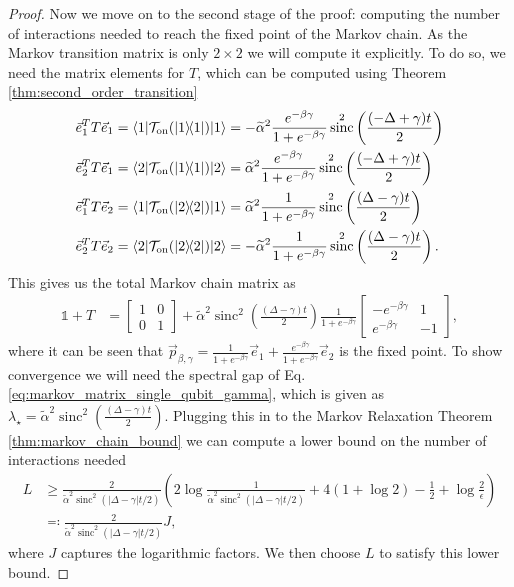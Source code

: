 \documentclass{article}
\newcommand{\on}{\rm on}
\newcommand{\ket}[1]{|#1\rangle}
\newcommand{\bra}[1]{\langle #1|}
\newcommand{\ketbra}[2]{| #1\rangle\! \langle #2|}
\newcommand{\identity}{\mathds{1}}
\DeclareMathOperator{\sinc}{sinc}
\begin{document}
\begin{proof}
 Now we move on to the second stage of the proof: computing the number of interactions needed to reach the fixed point of the Markov chain. As the Markov transition matrix is only $2 \times 2$ we will compute it explicitly. To do so, we need the matrix elements for $T$, which can be computed using Theorem \ref{thm:second_order_transition} 
\begin{align}
        \vec{e}_1^T T \vec{e}_1 = \bra{1} \mathcal{T}_{\on}(\ketbra{1}{1}) \ket{1} &= - \widetilde{\alpha}^2 \frac{e^{-\beta \gamma}}{1 + e^{-\beta \gamma}} \sinc^2 \left( \frac{(-\Delta + \gamma)t}{2}\right) \label{eq:single_qubit_markov_1}\\
        \vec{e}_2^T T \vec{e}_1 = \bra{2} \mathcal{T}_{\on}(\ketbra{1}{1}) \ket{2} &=  \widetilde{\alpha}^2 \frac{e^{-\beta \gamma}}{1 + e^{-\beta \gamma}} \sinc^2 \left( \frac{(-\Delta + \gamma)t}{2}\right) \\
        \vec{e}_1^T T \vec{e}_2 = \bra{1} \mathcal{T}_{\on}(\ketbra{2}{2}) \ket{1} &=  \widetilde{\alpha}^2 \frac{1}{1 + e^{-\beta \gamma}} \sinc^2 \left( \frac{(\Delta - \gamma)t}{2}\right)\\
        \vec{e}_2^T T \vec{e}_2 = \bra{2} \mathcal{T}_{\on}(\ketbra{2}{2}) \ket{2} &= - \widetilde{\alpha}^2 \frac{1}{1 + e^{-\beta \gamma}} \sinc^2 \left( \frac{(\Delta - \gamma)t}{2}\right). \label{eq:single_qubit_markov_4}
    \end{align}
This gives us the total Markov chain matrix as 
\begin{align}
    \identity + T &= \begin{bmatrix} 1 & 0 \\ 0 & 1 \end{bmatrix} + \widetilde{\alpha}^2 \sinc^2 \left(\frac{(\Delta - \gamma)t}{2} \right) \frac{1}{1 + e^{-\beta \gamma}}\begin{bmatrix} -e^{-\beta \gamma} & 1 \\ e^{-\beta \gamma} & -1\end{bmatrix},\label{eq:markov_matrix_single_qubit_gamma}
\end{align}
 where it can be seen that $\vec{p}_{\beta, \gamma} = \frac{1}{1 + e^{-\beta \gamma}} \vec{e}_1 + \frac{e^{-\beta \gamma}}{1 + e^{-\beta \gamma}} \vec{e}_2$ is the fixed point. To show convergence we will need the spectral gap of Eq. \eqref{eq:markov_matrix_single_qubit_gamma}, which is given as $\lambda_{\star} = \widetilde{\alpha}^2 \sinc^2 \left( \frac{(\Delta - \gamma) t}{2} \right)$. Plugging this in to the Markov Relaxation Theorem \ref{thm:markov_chain_bound} we can compute a lower bound on the number of interactions needed 
 \begin{align}
     L &\ge \frac{2}{\widetilde{\alpha}^2 \sinc^2(|\Delta - \gamma|t/2)} \left( 2 \log \frac{1}{\widetilde{\alpha}^2 \sinc^2(|\Delta - \gamma|t/2)} + 4( 1 + \log 2) - \frac{1}{2} + \log \frac{2}{\epsilon} \right) \\
     &\eqqcolon \frac{2}{\widetilde{\alpha}^2 \sinc^2(|\Delta - \gamma| t/2)} J, \label{eq:one_qubit_l_bound_1}
 \end{align}
where $J$ captures the logarithmic factors.  We then choose $L$ to satisfy this lower bound.
 

\end{proof}
\end{document}
